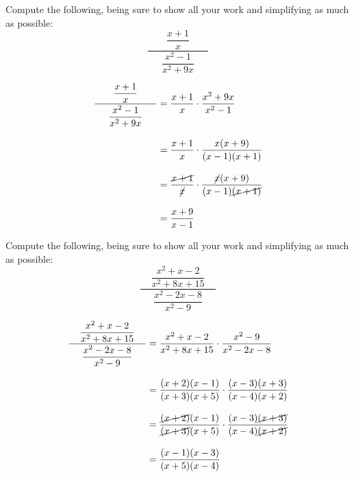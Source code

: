\documentclass[11pt,letterpaper]{article}
\begin{document}
\newpage





 Compute the following, being sure to show all your work and simplifying as much as possible:
	\[
	\dfrac{\phantom{.}\;\;\;\;\;\;\dfrac{x + 1}{x}\;\;\;\;\;\;\phantom{.}}{\dfrac{x^2 - 1}{x^2 + 9x}}
	\] \pspace

\sol
	\[
	\begin{aligned}
	\dfrac{\phantom{.}\;\;\;\;\;\;\dfrac{x + 1}{x}\;\;\;\;\;\;\phantom{.}}{\dfrac{x^2 - 1}{x^2 + 9x}}&= \dfrac{x + 1}{x} \cdot \dfrac{x^2 + 9x}{x^2 - 1} \\[0.3cm]
	&= \dfrac{x + 1}{x} \cdot \dfrac{x(x + 9)}{(x - 1)(x + 1)} \\[0.3cm]
	&= \dfrac{\cancel{x + 1}}{\cancel{x}} \cdot \dfrac{\cancel{x}(x + 9)}{(x - 1)\cancel{(x + 1)}} \\[0.3cm] 
	&= \dfrac{x + 9}{x - 1}
	\end{aligned}
	\]





\newpage





 Compute the following, being sure to show all your work and simplifying as much as possible:
	\[
	\dfrac{\phantom{.}\;\;\;\dfrac{x^2 + x - 2}{x^2 + 8x + 15}\;\;\;\phantom{.}}{\dfrac{x^2 - 2x - 8}{x^2 - 9}}
	\] \pspace

\sol
	\[
	\begin{aligned}
	\dfrac{\phantom{.}\;\;\;\dfrac{x^2 + x - 2}{x^2 + 8x + 15}\;\;\;\phantom{.}}{\dfrac{x^2 - 2x - 8}{x^2 - 9}}&= \dfrac{x^2 + x - 2}{x^2 + 8x + 15} \cdot \dfrac{x^2 - 9}{x^2 - 2x- 8} \\[0.3cm]
	&= \dfrac{(x + 2)(x - 1)}{(x + 3)(x + 5)} \cdot \dfrac{(x - 3)(x + 3)}{(x - 4)(x + 2)} \\[0.3cm]
	&= \dfrac{\cancel{(x + 2)}(x - 1)}{\cancel{(x + 3)}(x + 5)} \cdot \dfrac{(x - 3)\cancel{(x + 3)}}{(x - 4)\cancel{(x + 2)}} \\[0.3cm]
	&= \dfrac{(x - 1)(x - 3)}{(x + 5)(x - 4)}
	\end{aligned}
	\]





\end{document}
